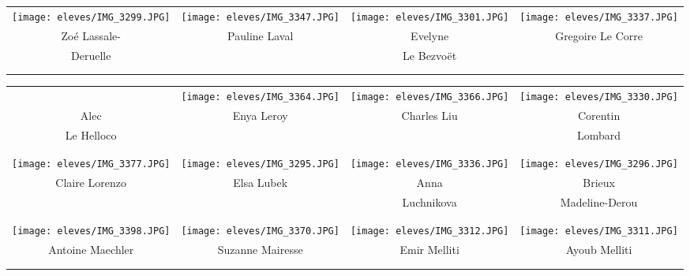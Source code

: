 \begin{center}
\begin{tabular}{cccc}
\texttt{[image: eleves/IMG\_3299.JPG]} &
\texttt{[image: eleves/IMG\_3347.JPG]} &
\texttt{[image: eleves/IMG\_3301.JPG]} &
\texttt{[image: eleves/IMG\_3337.JPG]} \\
Zoé Lassale- & Pauline Laval & Evelyne & Gregoire Le Corre \\ Deruelle & & Le Bezvoët & \\ \\ \\ 

\end{tabular}
\end{center}
	
\vfill
\pagebreak

\begin{center}
\begin{tabular}{cccc}
& %
\texttt{[image: eleves/IMG\_3364.JPG]} &
\texttt{[image: eleves/IMG\_3366.JPG]} &
\texttt{[image: eleves/IMG\_3330.JPG]} \\
Alec & Enya Leroy & Charles Liu & Corentin \\ Le Helloco & & & Lombard \\ \\ \\ 

\texttt{[image: eleves/IMG\_3377.JPG]} &
\texttt{[image: eleves/IMG\_3295.JPG]} &
\texttt{[image: eleves/IMG\_3336.JPG]} &
\texttt{[image: eleves/IMG\_3296.JPG]} \\
Claire Lorenzo & Elsa Lubek & Anna & Brieux \\ & & Luchnikova & Madeline-Derou \\ \\ \\ 

\texttt{[image: eleves/IMG\_3398.JPG]} &
\texttt{[image: eleves/IMG\_3370.JPG]} &
\texttt{[image: eleves/IMG\_3312.JPG]} &
\texttt{[image: eleves/IMG\_3311.JPG]} \\
Antoine Maechler & Suzanne Mairesse & Emir Melliti & Ayoub Melliti \\ \\ \\ 


\end{tabular}
\end{center}
